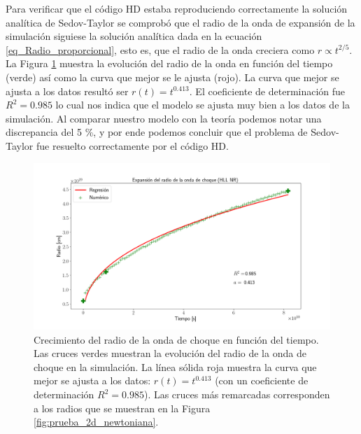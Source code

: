 \documentclass[12pt,a4paper]{book}
\begin{document}
Para verificar que el código HD estaba reproduciendo correctamente la solución analítica de Sedov-Taylor se comprobó que el radio de la onda de expansión de la simulación siguiese la solución analítica 
dada en la ecuación \ref{eq_Radio_proporcional}, esto es, que el radio de la onda creciera como $r\propto t^{2/5}$. La Figura \ref{fig:Expansion_HLL_NR} muestra la evolución del radio de la onda en función del tiempo (verde) así como 
la curva que mejor se le ajusta (rojo). La curva que mejor se ajusta a los datos resultó ser $r(t) = t^{0.413}$. El coeficiente de determinación fue $R^2= 0.985$ lo cual nos indica que el modelo se ajusta muy bien a 
los datos de la simulación. Al comparar nuestro modelo con la teoría podemos notar una discrepancia del 5 \%, y por ende podemos concluir que el problema de Sedov-Taylor fue resuelto correctamente por el código HD.

\begin{figure}
  \centering
  \includegraphics[width=1\textwidth]{./Figuras/verificacion_del_codigo/prueba_2d_newtoniana/Expansion_HLL_NR_res_1000.png}
    \caption{Crecimiento del radio de la onda de choque en función del tiempo. Las cruces verdes muestran la evolución del radio de la onda de choque en la simulación. La línea sólida roja muestra la curva que mejor 
    se ajusta a los datos: $r(t) = t^{0.413}$ (con un coeficiente de determinación $R^2= 0.985$). Las cruces más remarcadas corresponden a los radios que se muestran en la Figura \ref{fig:prueba_2d_newtoniana}.}
    \label{fig:Expansion_HLL_NR}
\end{figure}
\end{document}
